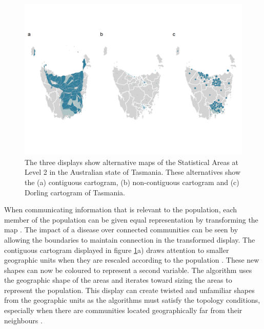 \begin{Schunk}
\begin{figure}
\includegraphics[width=0.95\linewidth]{kobakian-cook_files/figure-latex/tas_displays-1} \caption[The three displays show alternative maps of the Statistical Areas at Level 2 in the Australian state of Tasmania]{The three displays show alternative maps of the Statistical Areas at Level 2 in the Australian state of Tasmania. These alternatives show the (a) contiguous cartogram, (b) non-contiguous cartogram and (c) Dorling cartogram of Tasmania.}\label{fig:tas_displays}
\end{figure}
\end{Schunk}

When communicating information that is relevant to the population, each
member of the population can be given equal representation by
transforming the map \citep{TVSSS}. The impact of a disease over
connected communities can be seen by allowing the boundaries to maintain
connection in the transformed display. The contiguous cartogram
displayed in figure \ref{fig:tas_displays}a) draws attention to smaller
geographic units when they are rescaled according to the population
\citep{DMAHP}. These new shapes can now be coloured to represent a
second variable. The algorithm uses the geographic shape of the areas
and iterates toward sizing the areas to represent the population. This
display can create twisted and unfamiliar shapes from the geographic
units as the algorithms must satisfy the topology conditions, especially
when there are communities located geographically far from their
neighbours \citep{TVSSS}.

